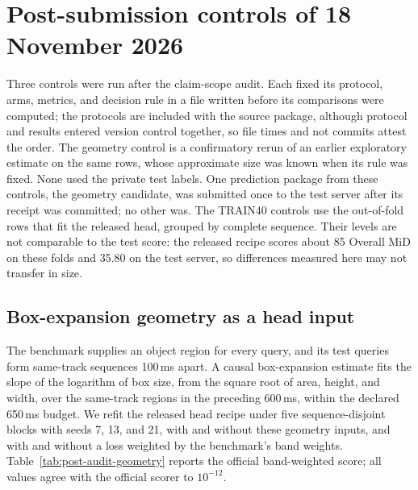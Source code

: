 \section{Post-submission controls of 18 November 2026}
\label{sec:post-audit}

Three controls were run after the claim-scope audit. Each fixed its protocol, arms, metrics, and decision rule in a file written before its comparisons were computed; the protocols are included with the source package, although protocol and results entered version control together, so file times and not commits attest the order. The geometry control is a confirmatory rerun of an earlier exploratory estimate on the same rows, whose approximate size was known when its rule was fixed. None used the private test labels. One prediction package from these controls, the geometry candidate, was submitted once to the test server after its receipt was committed; no other was. The TRAIN40 controls use the out-of-fold rows that fit the released head, grouped by complete sequence. Their levels are not comparable to the test score: the released recipe scores about 85 Overall MiD on these folds and 35.80 on the test server, so differences measured here may not transfer in size.

\subsection{Box-expansion geometry as a head input}
\label{sec:post-audit-geometry}
The benchmark supplies an object region for every query, and its test queries form same-track sequences 100\,ms apart. A causal box-expansion estimate fits the slope of the logarithm of box size, from the square root of area, height, and width, over the same-track regions in the preceding 600\,ms, within the declared 650\,ms budget. We refit the released head recipe under five sequence-disjoint blocks with seeds 7, 13, and 21, with and without these geometry inputs, and with and without a loss weighted by the benchmark's band weights. Table~\ref{tab:post-audit-geometry} reports the official band-weighted score; all values agree with the official scorer to $10^{-12}$.

\begin{table}[htbp]
\centering\small
\caption{Head readouts on TRAIN40 development folds; lower is better. Values are the mean and sample standard deviation over three seeds where a fit is involved. Differences are paired sequence-bootstrap estimates against the released recipe, with 10,000 resamples of 40 sequences.}
\label{tab:post-audit-geometry}
\end{table}

